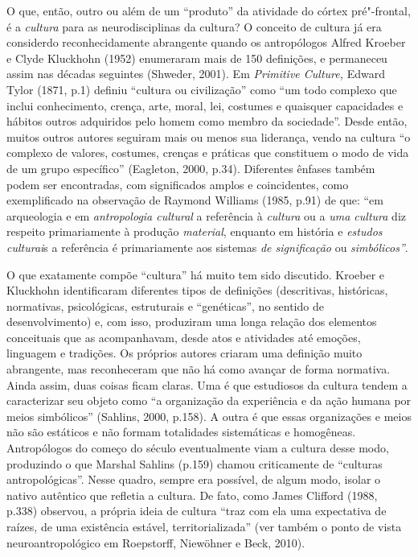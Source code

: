 O que, então, outro ou além de um ``produto'' da atividade do córtex
pré"-frontal, é a \emph{cultura} para as neurodisciplinas da cultura? O
conceito de cultura já era considerdo reconhecidamente abrangente quando
os antropólogos Alfred Kroeber e Clyde Kluckhohn (1952) enumeraram mais
de 150 definições, e permaneceu assim nas décadas seguintes (Shweder,
2001). Em \emph{Primitive Culture,} Edward Tylor (1871, p.1) definiu
``cultura ou civilização'' como ``um todo complexo que inclui
conhecimento, crença, arte, moral, lei, costumes e quaisquer capacidades
e hábitos outros adquiridos pelo homem como membro da sociedade''. Desde
então, muitos outros autores seguiram mais ou menos sua liderança, vendo
na cultura ``o complexo de valores, costumes, crenças e práticas que
constituem o modo de vida de um grupo específico'' (Eagleton, 2000,
p.34). Diferentes ênfases também podem ser encontradas, com significados
amplos e coincidentes, como exemplificado na observação de Raymond
Williams (1985, p.91) de que: ``em arqueologia e em \emph{antropologia
cultural} a referência à \emph{cultura} ou a \emph{uma cultura} diz
respeito primariamente à produção \emph{material}, enquanto em história
e \emph{estudos culturai}s a referência é primariamente aos sistemas
\emph{de significação} ou \emph{simbólicos''}.

O que exatamente compõe ``cultura'' há muito tem sido discutido. Kroeber
e Kluckhohn identificaram diferentes tipos de definições (descritivas,
históricas, normativas, psicológicas, estruturais e ``genéticas'', no
sentido de desenvolvimento) e, com isso, produziram uma longa relação
dos elementos conceituais que as acompanhavam, desde atos e atividades
até emoções, linguagem e tradições. Os próprios autores criaram uma
definição muito abrangente, mas reconheceram que não há como avançar de
forma normativa. Ainda assim, duas coisas ficam claras. Uma é que
estudiosos da cultura tendem a caracterizar seu objeto como ``a
organização da experiência e da ação humana por meios simbólicos''
(Sahlins, 2000, p.158). A outra é que essas organizações e meios não são
estáticos e não formam totalidades sistemáticas e homogêneas.
Antropólogos do começo do século  eventualmente viam a cultura desse
modo, produzindo o que Marshal Sahlins (p.159) chamou criticamente de
``culturas antropológicas''. Nesse quadro, sempre era possível, de algum
modo, isolar o nativo autêntico que refletia a cultura. De fato, como
James Clifford (1988, p.338) observou, a própria ideia de cultura ``traz
com ela uma expectativa de raízes, de uma existência estável,
territorializada'' (ver também o ponto de vista neuroantropológico em
Roepstorff, Niewöhner e Beck, 2010).

